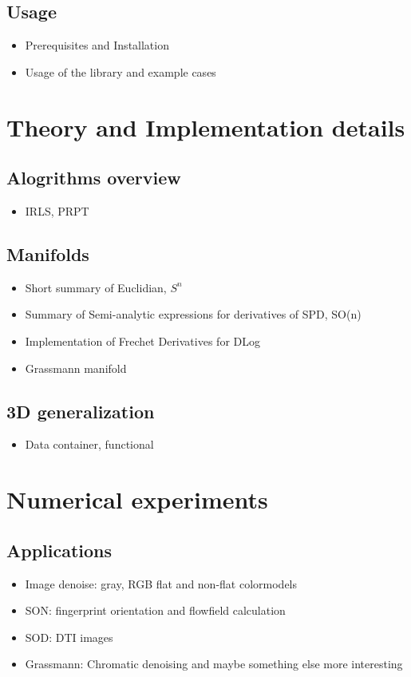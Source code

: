 \documentclass[7pt]{article}
\begin{document}
\begin{body}
\subsection{Usage}
\begin{itemize}
\item Prerequisites and Installation
\item Usage of the library and example cases
\end{itemize}

\section{Theory and Implementation details}

\subsection{Alogrithms overview}
\begin{itemize}
\item IRLS, PRPT
\end{itemize}


\subsection{Manifolds}
\begin{itemize}
\item Short summary of Euclidian, $S^n$
\item Summary of Semi-analytic expressions for derivatives of SPD, SO(n)
\item Implementation of Frechet Derivatives for DLog
\item Grassmann manifold
\end{itemize}


\subsection{3D generalization}
\begin{itemize}
\item Data container, functional 
\end{itemize}


\section{Numerical experiments}
\subsection{Applications}
\begin{itemize}
\item Image denoise: gray, RGB flat and non-flat colormodels
\item SON: fingerprint orientation and flowfield calculation
\item SOD: DTI images
\item Grassmann: Chromatic denoising and maybe something else more interesting
\end{itemize}


\end{body}
\end{document}
